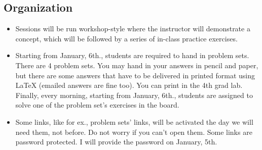 \documentclass[10pt]{article}
\begin{document}
\subsection*{Organization}
		\begin{itemize}
			\item Sessions will be run workshop-style where the instructor will demonstrate a concept, which will be followed by a series of in-class practice exercises. %
			\item Starting from January, 6th., students are required to hand in problem sets. There are 4 problem sets. You may hand in your answers in pencil and paper, but there are some answers that have to be delivered in printed format using \LaTeX \; (emailed answers are fine too). You can print in the 4th grad lab. Finally, every morning, starting from January, 6th., students are assigned to solve one of the problem set's exercises in the board.
			\item Some links, like for ex., problem sets' links, will be activated the day we will need them, not before. Do not worry if you can't open them. Some links are password protected. I will provide the password on January, 5th.
		\end{itemize}
\end{document}

